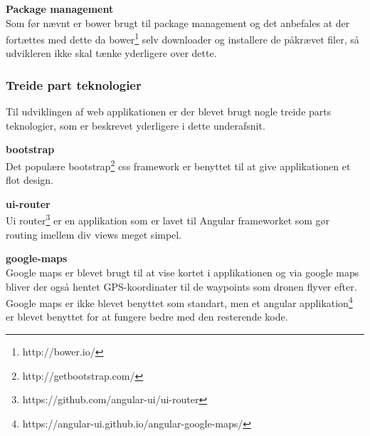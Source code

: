 \textbf{Package management}\\
Som før nævnt er bower brugt til package management og det anbefales at der fortættes med dette da bower\footnote{http://bower.io/} selv downloader og installere de påkrævet filer, så udvikleren ikke skal tænke yderligere over dette.  

\subsubsection{Treide part teknologier}
Til udviklingen af web applikationen er der blevet brugt nogle treide parts teknologier, som er beskrevet yderligere i dette underafsnit.

\textbf{bootstrap}\\
Det populære bootstrap\footnote{http://getbootstrap.com/} css framework er benyttet til at give applikationen et flot design.

\textbf{ui-router}\\
Ui router\footnote{https://github.com/angular-ui/ui-router} er en applikation som er lavet til Angular frameworket som gør routing imellem div views meget simpel. 

\textbf{google-maps}\\
Google maps er blevet brugt til at vise kortet i applikationen og via google maps bliver der også hentet GPS-koordinater til de waypoints som dronen flyver efter. Google maps er ikke blevet benyttet som standart, men et angular applikation\footnote{https://angular-ui.github.io/angular-google-maps/} er blevet benyttet for at fungere bedre med den resterende kode.